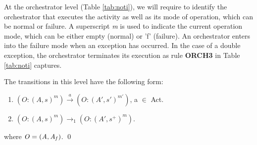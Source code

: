 At the orchestrator level (Table \ref{tab:noti}), we will require to identify the orchestrator that executes the activity as well as its mode of operation, which can be normal or failure. A superscript {\it m} is used to indicate the current operation mode, which can be either empty (normal) or 'f' (failure). An orchestrator enters into the failure mode when an exception has occurred. In the case of a double exception, the orchestrator terminates its execution as rule {\bf ORCH3} in Table \ref{tab:noti} captures.
\begin{definition}
The transitions in this level have the following form:

\begin{enumerate}
\item \hspace{0.1cm}$(O:(A,s)^{m})\xrightarrow{a}(O:(A',s')^{m'})$, a $\in$ Act. %
\item \hspace{0.1cm}$(O:(A,s)^{m})\xrightarrow{}_1(O:(A',s^+)^{m})$. %
\end{enumerate}
where ${\it O= (A,A_f)}$.
\vspace{-0.4cm}
\qed
\end{definition}
\vspace{0.2cm}
